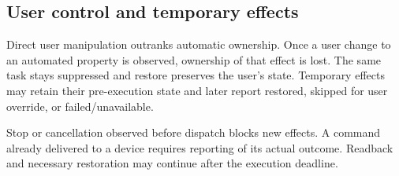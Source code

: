 \subsection{User control and temporary effects}

Direct user manipulation outranks automatic ownership. Once a user change to an automated property is observed, ownership of that effect is lost. The same task stays suppressed and restore preserves the user's state. Temporary effects may retain their pre-execution state and later report restored, skipped for user override, or failed/unavailable. 

Stop or cancellation observed before dispatch blocks new effects. A command already delivered to a device requires reporting of its actual outcome. Readback and necessary restoration may continue after the execution deadline. 

